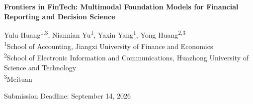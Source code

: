 \documentclass[12pt,letterpaper]{article}
\renewcommand{\thefootnote}{\arabic{footnote}}
\begin{document}
\renewcommand{\thefootnote}{\ensuremath{\dagger}}%
\begin{center}
  {\large\bfseries
Frontiers in FinTech: Multimodal Foundation Models for Financial
Reporting and Decision Science}

  \vspace{14pt}

  {\normalsize Yulu Huang\textsuperscript{1,3}, Niannian Yu\textsuperscript{1},
  Yaxin Yang\textsuperscript{1}, Yong Huang\textsuperscript{2,3}\footnotemark}\\[6pt]
  {\footnotesize
  \textsuperscript{1}School of Accounting, Jiangxi University of Finance and Economics\\
  \textsuperscript{2}School of Electronic Information and Communications,
  Huazhong University of Science and Technology\\
  \textsuperscript{3}Meituan}

  \vspace{8pt}
  {\small Submission Deadline: September 14, 2026}
\end{center}
%
\renewcommand{\thefootnote}{\arabic{footnote}}%
\setcounter{footnote}{0}

\vspace{14pt}
\end{document}
